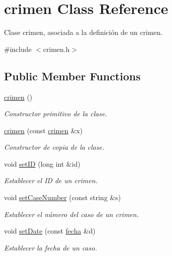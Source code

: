 \hypertarget{classcrimen}{}\section{crimen Class Reference}
\label{classcrimen}


Clase crimen, asociada a la definición de un crimen.  




{\ttfamily \#include $<$crimen.\+h$>$}

\subsection*{Public Member Functions}
\begin{DoxyCompactItemize}
\item 
\hyperlink{classcrimen_ab1147e36869c7e635699e4ef746a7555}{crimen} ()
\begin{DoxyCompactList}\small\item\em Constructor primitivo de la clase. \end{DoxyCompactList}\item 
\hyperlink{classcrimen_a50b783e821c2f5bc829eceb9048c12d7}{crimen} (const \hyperlink{classcrimen}{crimen} \&x)
\begin{DoxyCompactList}\small\item\em Constructor de copia de la clase. \end{DoxyCompactList}\item 
void \hyperlink{classcrimen_a2675734f5049f41b5fb5dbc4778df7f8}{set\+I\+D} (long int \&id)
\begin{DoxyCompactList}\small\item\em Establecer el I\+D de un crimen. \end{DoxyCompactList}\item 
void \hyperlink{classcrimen_a98ee8c42a0ec09c704c5f17e812a6bd5}{set\+Case\+Number} (const string \&s)
\begin{DoxyCompactList}\small\item\em Establecer el número del caso de un crimen. \end{DoxyCompactList}\item 
void \hyperlink{classcrimen_ac308c139bb8b599a7badbecd91bfbc5a}{set\+Date} (const \hyperlink{classfecha}{fecha} \&d)
\begin{DoxyCompactList}\small\item\em Establecer la fecha de un caso. \end{DoxyCompactList}\item 

\end{DoxyCompactItemize}
